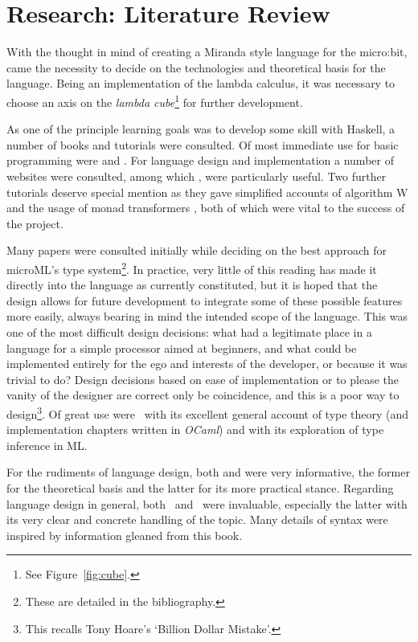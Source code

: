 \documentclass[12pt, a4paper]{report}
\begin{document}
\section{Research: Literature Review}
With the thought in mind of creating a Miranda style language for the micro:bit, came the necessity
to decide on the technologies and theoretical basis for the language. Being an implementation of the
lambda calculus, it was necessary to choose an axis on the \textit{lambda cube}\footnote{See
Figure~\ref{fig:cube}.} for further development. 

As one of the principle learning goals was to develop some skill with Haskell, a number of books and
tutorials were consulted. Of most immediate use for basic programming were \cite{Lipovaca:2011:LYH:2018642}
and \cite{rwh}. For language design and implementation a number of websites were consulted, among which
\cite{scheme}, \cite{diehl} were particularly useful. Two further tutorials deserve special mention
as they gave simplified accounts of algorithm W \cite{algoW} and the usage of monad transformers
\cite{transformers}, both of which were vital to the success of the project.

Many papers were consulted initially while deciding on the best approach for microML's type
system\footnote{These are detailed in the bibliography.}. In practice, very little of this
reading has made it directly into the language as currently constituted, but it is hoped that the
design allows for future development to integrate some of these possible features more easily,
always bearing in mind the intended scope of the language. This was one of the most difficult
design decisions: what had a legitimate place in a language for a simple processor aimed at
beginners, and what could be implemented entirely for the ego and interests of the developer, or because it
was trivial to do? Design decisions based on ease of implementation or to please the vanity of the
designer are correct only be coincidence, and this is a poor way to design\footnote{This recalls
Tony Hoare's `Billion Dollar Mistake'.}. Of great use were~\cite{Pierce:2002:TPL:509043} with its
excellent general account of type theory (and implementation chapters written in \textit{OCaml})
and\@\cite{Pierce:2004:ATT:1076265} with its exploration of type inference in ML\@.

For the rudiments of language design, both\@\cite{spj2} and\@\cite{spj1} were very informative, the
former for the theoretical basis and the latter for its more practical stance. Regarding language
design in general, both~\cite{Harper:2012:PFP:2431407} and~\cite{plp} were invaluable, especially
the latter with its very clear and concrete handling of the topic. Many details of syntax were
inspired by information gleaned from this book.
\end{document}
